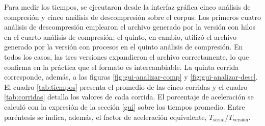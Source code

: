 \documentclass{report}
\begin{document}
Para medir los tiempos, se ejecutaron desde la interfaz gráfica cinco análisis de compresión y cinco análisis de descompresión sobre el corpus. Los primeros cuatro análisis de descompresión emplearon el archivo generado por la versión con hilos en el cuarto análisis de compresión; el quinto, en cambio, utilizó el archivo generado por la versión con procesos en el quinto análisis de compresión. En todos los casos, las tres versiones expandieron el archivo correctamente, lo que confirma en la práctica que el formato es intercambiable. La quinta corrida corresponde, además, a las figuras \ref{fig:gui-analizar-comp} y \ref{fig:gui-analizar-desc}. El cuadro \ref{tab:tiempos} presenta el promedio de las cinco corridas y el cuadro \ref{tab:corridas} detalla los valores de cada corrida. El porcentaje de aceleración se calculó con la expresión de la sección \ref{gui} sobre los tiempos promedio. Entre paréntesis se indica, además, el factor de aceleración equivalente, $T_{\mbox{serial}} / T_{\mbox{versión}}$.
\end{document}
